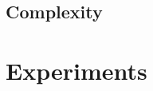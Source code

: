 \documentclass[twocolumn]{article}
\begin{document}




\subsection{Complexity}


\section{Experiments}
\end{document}

